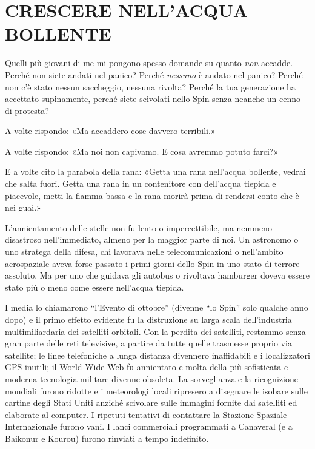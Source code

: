 \chapter{CRESCERE NELL'ACQUA BOLLENTE}\label{crescere-nell-acqua-bollente}

\hfill\break

Quelli più giovani di me mi pongono spesso domande su quanto \emph{non}
accadde. Perché non siete andati nel panico? Perché \emph{nessuno} è
andato nel panico? Perché non c'è stato nessun saccheggio, nessuna
rivolta? Perché la tua generazione ha accettato supinamente, perché
siete scivolati nello Spin senza neanche un cenno di protesta?

A volte rispondo: «Ma accaddero cose davvero terribili.»

A volte rispondo: «Ma noi non capivamo. E cosa avremmo potuto farci?»

E a volte cito la parabola della rana: «Getta una rana nell'acqua
bollente, vedrai che salta fuori. Getta una rana in un contenitore con
dell'acqua tiepida e piacevole, metti la fiamma bassa e la rana morirà
prima di rendersi conto che è nei guai.»

L'annientamento delle stelle non fu lento o impercettibile, ma nemmeno
disastroso nell'immediato, almeno per la maggior parte di noi. Un
astronomo o uno stratega della difesa, chi lavorava nelle
telecomunicazioni o nell'ambito aerospaziale aveva forse passato i primi
giorni dello Spin in uno stato di terrore assoluto. Ma per uno che
guidava gli autobus o rivoltava hamburger doveva essere stato più o meno
come essere nell'acqua tiepida.

I media lo chiamarono ``l'Evento di ottobre'' (divenne ``lo Spin'' solo
qualche anno dopo) e il primo effetto evidente fu la distruzione su
larga scala dell'industria multimiliardaria dei satelliti orbitali. Con
la perdita dei satelliti, restammo senza gran parte delle reti
televisive, a partire da tutte quelle trasmesse proprio via satellite;
le linee telefoniche a lunga distanza divennero inaffidabili e i
localizzatori GPS inutili; il World Wide Web fu annientato e molta della
più sofisticata e moderna tecnologia militare divenne obsoleta. La
sorveglianza e la ricognizione mondiali furono ridotte e i meteorologi
locali ripresero a disegnare le isobare sulle cartine degli Stati Uniti
anziché scivolare sulle immagini fornite dai satelliti ed elaborate al
computer. I ripetuti tentativi di contattare la Stazione Spaziale
Internazionale furono vani. I lanci commerciali programmati a Canaveral
(e a Baikonur e Kourou) furono rinviati a tempo indefinito.

